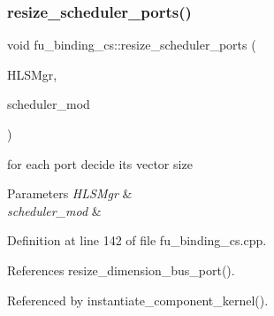 \subsubsection{\texorpdfstring{resize\+\_\+scheduler\+\_\+ports()}{resize\_scheduler\_ports()}}
{\footnotesize\ttfamily void fu\+\_\+binding\+\_\+cs\+::resize\+\_\+scheduler\+\_\+ports (\begin{DoxyParamCaption}\item[{const \hyperlink{hls__manager_8hpp_acd3842b8589fe52c08fc0b2fcc813bfe}{H\+L\+S\+\_\+manager\+Ref}}]{H\+L\+S\+Mgr,  }\item[{\hyperlink{structural__objects_8hpp_a8ea5f8cc50ab8f4c31e2751074ff60b2}{structural\+\_\+object\+Ref}}]{scheduler\+\_\+mod }\end{DoxyParamCaption})\hspace{0.3cm}{\ttfamily [protected]}}



for each port decide its vector size 


\begin{DoxyParams}{Parameters}
{\em H\+L\+S\+Mgr} & \\
\hline
{\em scheduler\+\_\+mod} & \\
\hline
\end{DoxyParams}


Definition at line 142 of file fu\+\_\+binding\+\_\+cs.\+cpp.



References resize\+\_\+dimension\+\_\+bus\+\_\+port().



Referenced by instantiate\+\_\+component\+\_\+kernel().

